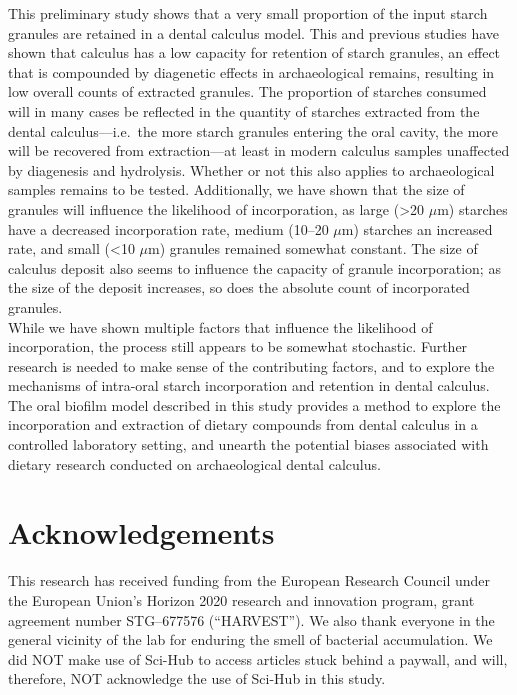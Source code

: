 \documentclass[
]{article}
\begin{document}
This preliminary study shows that a very small proportion of the input starch
granules are retained in a dental calculus model. This and previous studies
have shown that calculus has a low capacity for retention of starch granules,
an effect that is compounded by diagenetic effects in archaeological remains,
resulting in low overall counts of extracted granules.
The proportion of starches consumed will in many cases be reflected
in the quantity
of starches extracted from the dental calculus---i.e.~the more starch granules
entering the oral cavity, the more will be recovered from extraction---at
least in modern calculus samples unaffected by diagenesis and hydrolysis.
Whether or not this also applies to archaeological samples remains to be tested.
Additionally, we have
shown that the size of granules will influence the likelihood of incorporation,
as large (\textgreater20 \(\mu\)m) starches have a decreased incorporation rate, medium
(10--20 \(\mu\)m)
starches an increased rate, and small (\textless10 \(\mu\)m) granules remained somewhat
constant. The size of calculus deposit also seems to influence the capacity of
granule incorporation; as the size of the deposit increases, so does the
absolute count of incorporated granules.\\
While we have shown multiple factors that influence the likelihood
of incorporation, the process still appears to be somewhat stochastic. Further
research is needed to make sense of the contributing factors, and to explore the
mechanisms of intra-oral starch incorporation and retention in dental calculus.
The oral biofilm model described in this study provides a method
to explore the incorporation and extraction of dietary compounds from dental calculus
in a controlled laboratory setting, and unearth the potential biases associated
with dietary research conducted on archaeological dental calculus.

\hypertarget{acknowledgements}{%
\section*{Acknowledgements}\label{acknowledgements}}

This research has received funding from the European Research Council under the
European Union's Horizon 2020 research and innovation program, grant agreement
number STG--677576 (``HARVEST''). We also thank everyone in the general vicinity
of the lab for enduring the smell of bacterial accumulation.
We did NOT make use of Sci-Hub to access articles stuck behind a paywall,
and will, therefore, NOT acknowledge the use of Sci-Hub in this study.
\end{document}
